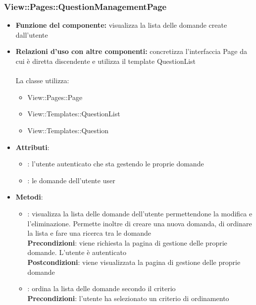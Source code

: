 \subsubsection{View::Pages::QuestionManagementPage}
\begin{itemize}
\item\textbf{Funzione del componente:} visualizza la lista delle domande create dall'utente
				\item\textbf{Relazioni d'uso con altre componenti:} concretizza l'interfaccia Page da cui è diretta discendente e utilizza il template QuestionList\\ \\
La classe utilizza:
	\begin{itemize}
		\item View::Pages::Page\\
		\item View::Templates::QuestionList\\
		\item View::Templates::Question\\
	\end{itemize}
\item\textbf{Attributi}:
	\begin{itemize}
		\item{}: l'utente autenticato che sta gestendo le proprie domande\\
		\item{}: le domande dell'utente user\\
	\end{itemize}
\item\textbf{Metodi}:
	\begin{itemize}
		\item{}: visualizza la lista delle domande dell'utente permettendone la modifica e l'eliminazione. Permette inoltre di creare una nuova domanda, di ordinare la lista e fare una ricerca tra le domande\\
			\textbf{Precondizioni}: viene richiesta la pagina di gestione delle proprie domande. L'utente è autenticato\\
			\textbf{Postcondizioni}: viene visualizzata la pagina di gestione delle proprie domande\\
		\item{}: ordina la lista delle domande secondo il criterio \\
			\textbf{Precondizioni}: l'utente ha selezionato un criterio di ordinamento\\

\end{itemize}
\end{itemize}
